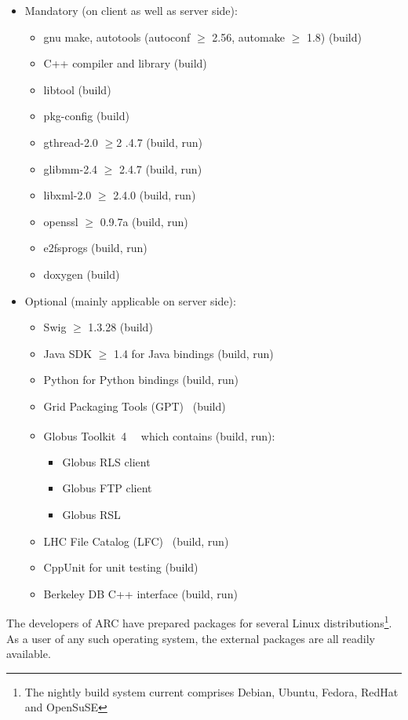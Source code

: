 \documentclass{article}                            %
\newcommand{\globus}{Globus Toolkit\textsuperscript{\textregistered}~4~}
\begin{document}
\begin{itemize}
\item Mandatory (on client as well as server side):
\begin{itemize}
\item gnu make, autotools (autoconf $\geq$ 2.56, automake $\geq$ 1.8) (build)
\item C++ compiler and library (build)
\item libtool (build)
\item pkg-config (build)
\item gthread-2.0 $\geq$2 .4.7 (build, run)
\item glibmm-2.4 $\geq$ 2.4.7 (build, run)
\item libxml-2.0 $\geq$ 2.4.0 (build, run)
\item openssl $\geq$ 0.9.7a (build, run)
\item e2fsprogs (build, run)
\item doxygen (build)
\end{itemize}
\item Optional (mainly applicable on server side):
\begin{itemize}
\item Swig $\geq$ 1.3.28 (build)
\item Java SDK $\geq$ 1.4 for Java bindings (build, run)
\item Python for Python bindings (build, run)
\item Grid Packaging Tools (GPT)~\cite{gpt} (build)
\item \globus~\cite{globus} which contains (build, run):
\begin{itemize}
\item Globus RLS client
\item Globus FTP client
\item Globus RSL
\end{itemize}
\item LHC File Catalog (LFC)~\cite{lfc} (build, run)
\item CppUnit for unit testing (build)
\item Berkeley DB C++ interface (build, run)
\end{itemize}
\end{itemize}

The developers of ARC have prepared packages for several Linux
distributions\footnote{The nightly build system current comprises Debian,
Ubuntu, Fedora, RedHat and OpenSuSE}. As a user of any such operating
system, the external packages are all readily available.
\end{document}
